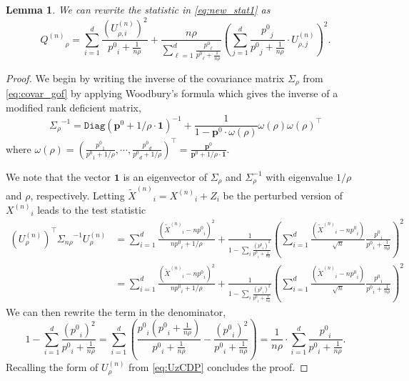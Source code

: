 \documentclass[twoside,letterpaper]{article} \usepackage{aistats2017}
\newtheorem{lemma}[theorem]{Lemma}
\theoremstyle{definition}
\theoremstyle{remark}
\begin{document}
\begin{lemma}
We can rewrite the statistic in \eqref{eq:new_stat1} as
\begin{equation}
{Q^{({n})}}_{\rho} =   \sum\limits_{i=1}^d \frac{\left({U^{(n)}_{{\rho},{i}}}\right)^2}{{p^0}_i+\frac{1}{n\rho}} +  \frac{n\rho}{\sum_{\ell=1}^d \frac{{p^0}_\ell}{{p^0}_\ell + \frac{1}{n\rho}} }\left(\sum\limits_{j=1}^d \frac{{p^0}_j}{{p^0}_j+ \frac{1}{n\rho}} \cdot{U^{(n)}_{{\rho},{j}}}\right)^2.
\label{eq:simple_stat1}
\end{equation}
\end{lemma}
\begin{proof}
We begin by writing the inverse of the covariance matrix ${{\Sigma}_{{\rho}}}$ from \eqref{eq:covar_gof} by applying Woodbury's formula \citep{Wood50} which gives the inverse of a modified rank deficient matrix,
\begin{equation}
{{\Sigma}_{{\rho}}}^{-1} = {\ensuremath{\mathtt{Diag}}}({{\mathbf{p}}^0}+1/\rho\cdot {\pmb{1}})^{-1} + \frac{1}{1-{{\mathbf{p}}^0}\cdot\omega(\rho)} \omega(\rho) \omega(\rho)^\intercal 
\label{eq:covar_inverse}
\end{equation}
where $\omega(\rho) =  \left( \frac{{p^0}_1}{{p^0}_1 + 1/\rho}, \cdots, \frac{{p^0}_d}{{p^0}_d + 1/\rho}\right)^\intercal = \frac{{\mathbf{p}}^0}{{{\mathbf{p}}^0}+1/\rho\cdot {\pmb{1}}}$.

We note that the vector ${\pmb{1}}$ is an eigenvector of $\Sigma_{\rho}$ and $\Sigma_\rho^{-1}$ with eigenvalue $1/\rho$ and $\rho$, respectively.  Letting ${\tilde{X}^{({n})}}_i = {X^{({n})}}_i + Z_i$ be the perturbed version of ${X^{({n})}}_i$ leads to the test statistic
\begin{align*}
\left({U^{(n)}_{{\rho}}}\right)^\intercal {{\Sigma}_{{n \rho}}}^{-1} {U^{(n)}_{{\rho}}} &=\sum\limits_{i=1}^d  \frac{({\tilde{X}^{({n})}}_i-n{p^0}_i)^2}{n{p^0}_i+1/\rho} +  \frac{1}{1 - \sum_i \frac{({p^0}_i)^2}{{p^0}_i+\frac{1}{n\rho}}}\left(\sum\limits_{i=1}^d \frac{({\tilde{X}^{({n})}}_i-n{p^0}_i)}{\sqrt{n}}\frac{{p^0}_i}{{p^0}_i+\frac{1}{n\rho}}\right)^2  \\
& = \sum\limits_{i=1}^d \frac{({\tilde{X}^{({n})}}_i-n{p^0}_i)^2}{n{p^0}_i+1/\rho} +  \frac{1}{1 - \sum_i \frac{({p^0}_i)^2}{{p^0}_i+\frac{1}{n \rho} }}\left(\sum\limits_{i=1}^d \frac{({\tilde{X}^{({n})}}_i-n{p^0}_i)}{\sqrt{n}}\frac{{p^0}_i}{{p^0}_i+\frac{1}{n \rho}}\right)^2
\end{align*}
We can then rewrite the term in the denominator,
$$ 
1- \sum_{i=1}^d\frac{({p^0}_i)^2}{{p^0}_i+\frac{1}{n \rho}} =\sum_{i=1}^d\left(\frac{{p^0}_i({p^0}_i+\frac{1}{n \rho})}{{p^0}_i+\frac{1}{n \rho}}-\frac{({p^0}_i)^2}{{p^0}_i+\frac{1}{n \rho}} \right) = \frac{1}{n \rho} \cdot \sum_{i=1}^d\frac{{p^0}_i}{{p^0}_i+\frac{1}{n \rho}}.
$$
Recalling the form of ${U^{(n)}_{{\rho}}}$ from \eqref{eq:UzCDP} concludes the proof.
\end{proof}
\end{document}
